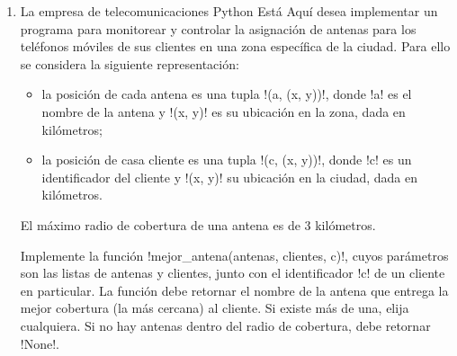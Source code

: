 \documentclass[11pt,spanish]{article}
\newcommand{\pond}[1]{[{\small\textbf{#1\%}}]}
\begin{document}
\begin{enumerate}[font=\Large\bfseries]
    \newpage
    \item
      \pond{25}
      La empresa de telecomunicaciones Python Está Aquí
      desea implementar un programa
      para monitorear y controlar la asignación de antenas
      para los teléfonos móviles de sus clientes
      en una zona específica de la ciudad.
      Para ello se considera la siguiente representación:
      \begin{itemize}
        \item la posición de cada antena es una tupla \li!(a, (x, y))!,
          donde \li!a! es el nombre de la antena
          y \li!(x, y)! es su ubicación en la zona, dada en kilómetros;
        \item la posición de casa cliente es una tupla \li!(c, (x, y))!,
          donde \li!c! es un identificador del cliente
          y \li!(x, y)! su ubicación en la ciudad, dada en kilómetros.
      \end{itemize}
      El máximo radio de cobertura de una antena es de 3 kilómetros.

      Implemente la función \li!mejor_antena(antenas, clientes, c)!,
      cuyos parámetros son las listas de antenas y clientes,
      junto con el identificador \li!c!
      de un cliente en particular.
      La función debe retornar el nombre de la antena
      que entrega la mejor cobertura (la más cercana) al cliente.
      Si existe más de una, elija cualquiera.
      Si no hay antenas dentro del radio de cobertura,
      debe retornar \li!None!.

      

  \end{enumerate}
\end{document}

